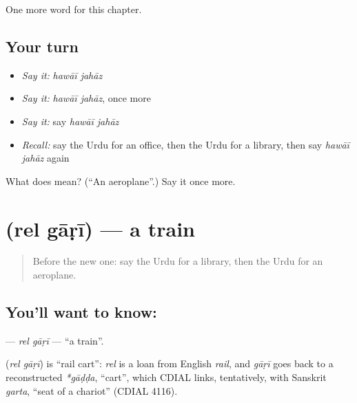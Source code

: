 \begin{grammarlens}[title={What you've built}]
One more word for this chapter.
\end{grammarlens}

\subsection*{Your turn}
\begin{itemize}
\raggedright
  \item \emph{Say it:} \emph{hawāī jahāz}
  \item \emph{Say it:} \emph{hawāī jahāz}, once more
  \item \emph{Say it:} say \emph{hawāī jahāz}
  \item \emph{Recall:} say the Urdu for an office, then the Urdu for a library, then say \emph{hawāī jahāz} again
\end{itemize}

\begin{tcolorbox}[breakable,colback=teal!4,colframe=teal!35!black,title={Before you move on}]
What does   mean? (\textquotedblleft{}An aeroplane\textquotedblright{}.) Say it once more.
\end{tcolorbox}
\section[\texorpdfstring{\ur{ریل} \ur{گاڑی} (rel gāṛī)}{ریل گاڑی (rel gāṛī)}]{  (rel gāṛī) — a train}

\label{lesson:UR-C103-relgari}



\begin{quote}
Before the new one: say the Urdu for a library, then the Urdu for an aeroplane.
\end{quote}

\subsection*{You'll want to know:  }
\textbf{ } — \emph{rel gāṛī} — \textquotedblleft{}a train\textquotedblright{}.

\begin{cousinweb}
\textbf{ } (\emph{rel gāṛī}) is \textquotedblleft{}rail cart\textquotedblright{}: \emph{rel} is a loan from English \emph{rail}, and \emph{gāṛī} goes back to a reconstructed \emph{*gāḍḍa}, \textquotedblleft{}cart\textquotedblright{}, which CDIAL links, tentatively, with Sanskrit \emph{garta}, \textquotedblleft{}seat of a chariot\textquotedblright{} (CDIAL 4116).
\end{cousinweb}

